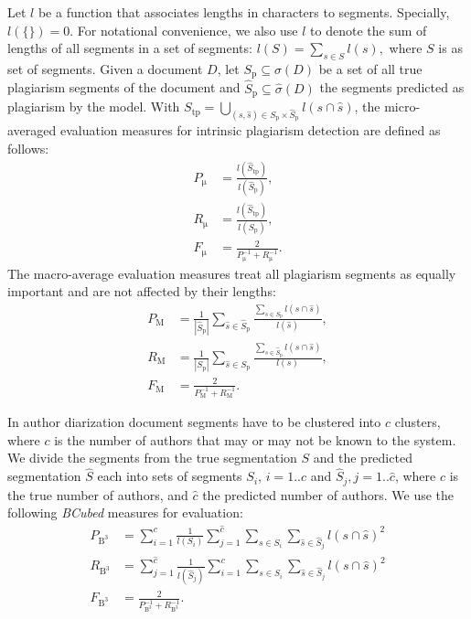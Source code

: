 \documentclass[10pt, a4paper]{article}
\begin{document}
Let $l$ be a function that associates lengths in characters to segments. Specially, $l(\{\}) = 0$. For notational convenience, we also use $l$ to denote the sum of lengths of all segments in a set of segments: $l(S) = \sum_{s\in S} l(s),$ where $S$ is as set of segments. Given a document $D$, let $S_\mathrm{p} \subseteq \sigma(D)$ be a set of all true plagiarism segments of the document and $\hat{S}_\mathrm{p} \subseteq \hat{\sigma}(D)$ the segments predicted as plagiarism by the  model. With ${S_\mathrm{tp} = \bigcup_{(s,\hat{s})\in S_\mathrm{p}\times\hat{S}_\mathrm{p}} l(s\cap\hat{s})}$, the micro-averaged evaluation measures for intrinsic plagiarism detection are defined as follows:
\begin{align}
P_\mathrm{\mu} &= \frac{l(\hat{S}_\mathrm{tp})}{l(\hat{S}_\mathrm{p})}, \\
R_\mathrm{\mu} &= \frac{l(\hat{S}_\mathrm{tp})}{l(S_\mathrm{p})}, \\
F_\mathrm{\mu} &= \frac{2}{P_\mathrm{\mu}^{-1}+R_\mathrm{\mu}^{-1}}.
\end{align}
The macro-average evaluation measures treat all plagiarism segments as equally important and are not affected by their lengths:
\begin{align}
P_\mathrm{M} &= \frac{1}{|\hat{S}_\mathrm{p}|}
	\sum_{\hat{s}\in\hat{S}_\mathrm{p}}
		\frac{{\sum_{s\in S_\mathrm{p}} l(s\cap\hat{s})}}{l(\hat{s})}, \\
R_\mathrm{M} &= \frac{1}{|S_\mathrm{p}|}
	\sum_{\hat{s}\in S_\mathrm{p}}
		\frac{{\sum_{s\in \hat{S}_\mathrm{p}} l(s\cap\hat{s})}}{l(s)}, \\
F_\mathrm{M} &= \frac{2}{P_\mathrm{M}^{-1}+R_\mathrm{M}^{-1}}.
\end{align}

In author diarization document segments have to be clustered into $c$ clusters, where $c$ is the number of authors that may or may not be known to the system. We divide the segments from the true segmentation $S$ and the predicted segmentation $\hat{S}$ each into sets of segments $S_i$, $i=1..c$ and $\hat{S}_j, j=1..\hat{c}$, where $c$ is the true number of authors, and $\hat{c}$ the predicted number of authors. We use the following \emph{BCubed} measures for evaluation:
\begin{align}
P_\mathrm{\mathrm{B}^3} &= \sum_{i=1}^c \frac{1}{l(S_i)}\sum_{j=1}^{\hat{c}}
	\sum_{s\in S_i}	\sum_{\hat{s}\in\hat{S}_j} l(s\cap \hat{s})^2 \\
R_\mathrm{\mathrm{B}^3} &= \sum_{j=1}^{\hat{c}} \frac{1}{l(\hat{S}_j)}\sum_{i=1}^{c}
	\sum_{s\in S_i}	\sum_{\hat{s}\in\hat{S}_j} l(s\cap \hat{s})^2 \\
F_\mathrm{\mathrm{B}^3} &= \frac{2}{P_\mathrm{\mathrm{B}^3}^{-1}+R_\mathrm{\mathrm{B}^3}^{-1}}.
\end{align}
\end{document}
